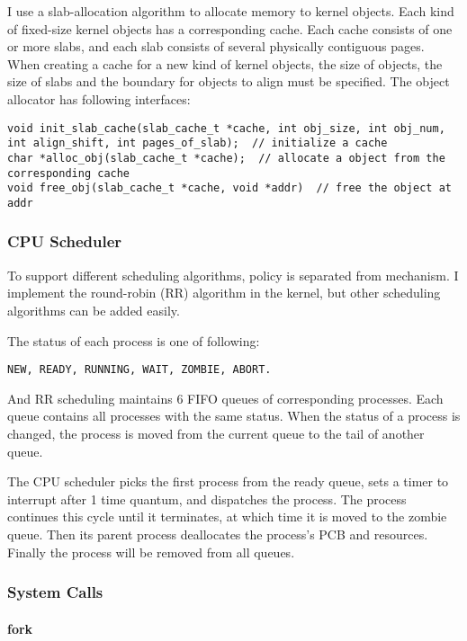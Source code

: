 \documentclass[12pt, a4paper]{article}
\begin{document}
I use a slab-allocation algorithm to allocate memory to kernel objects. Each kind of fixed-size kernel objects has a corresponding cache. Each cache consists of one or more slabs, and each slab consists of several physically contiguous pages. When creating a cache for a new kind of kernel objects, the size of objects, the size of slabs and the boundary for objects to align must be specified. The object allocator has following interfaces:
\begin{lstlisting}
void init_slab_cache(slab_cache_t *cache, int obj_size, int obj_num, int align_shift, int pages_of_slab);  // initialize a cache
char *alloc_obj(slab_cache_t *cache);  // allocate a object from the corresponding cache
void free_obj(slab_cache_t *cache, void *addr)  // free the object at addr
\end{lstlisting}

\subsubsection{CPU Scheduler}
To support different scheduling algorithms, policy is separated from mechanism. I implement the round-robin (RR) algorithm in the kernel, but other scheduling algorithms can be added easily.

The status of each process is one of following:
\begin{verbatim}
NEW, READY, RUNNING, WAIT, ZOMBIE, ABORT.
\end{verbatim}
And RR scheduling maintains 6 FIFO queues of corresponding processes. Each queue contains all processes with the same status. When the status of a process is changed, the process is moved from the current queue to the tail of another queue.

The CPU scheduler picks the first process from the ready queue, sets a timer to interrupt after 1 time quantum, and dispatches the process. The process continues this cycle until it terminates, at which time it is moved to the zombie queue. Then its parent process deallocates the process's PCB and resources. Finally the process will be removed from all queues.

\subsubsection{System Calls}

\paragraph{fork}
\end{document}
